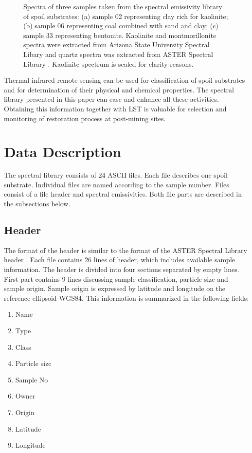\begin{appendices}
\begin{figure}[!t]
\begin{subfigure}[t]{.3\linewidth}
		\caption{}
	\end{subfigure}
	\vspace{1.5 em}
	\caption{Spectra of three samples taken from the spectral emissivity library of spoil substrates: (a) sample 02 representing clay rich for kaolinite; (b) sample 06 representing coal combined with sand and clay; (c) sample 33 representing bentonite. Kaolinite and montmorillonite spectra were extracted from Arizona State University Spectral Libary \cite{CB00} and quartz spectra was extracted from ASTER Spectral Library \cite{BH09}. Kaolinite spectrum is scaled for clarity reasons.}
	\label{fig:SpectraPreview}
\end{figure}

Thermal infrared remote sensing can be used for classification of spoil substrates and for determination of their physical and chemical properties. The spectral library presented in this paper can ease and enhance all these activities. Obtaining this information together with LST is valuable for selection and monitoring of restoration process at post-mining sites. 

\section{Data Description}

The spectral library consists of 24 ASCII files. Each file describes one spoil substrate. Individual files are named according to the sample number. Files consist of a file header and spectral emissivities. Both file parts are described in the subsections below.

\subsection{Header}

The format of the header is similar to the format of the ASTER Spectral Library header \cite{BH09}. Each file contains 26 lines of header, which includes available sample information. The header is divided into four sections separated by empty lines. First part contains 9 lines discussing sample classification, particle size and sample origin. Sample origin is expressed by latitude and longitude on the reference ellipsoid WGS84. This information is summarized in the following fields:

\begin{enumerate}
	\item	Name
	\item Type
	\item Class
	\item Particle size
	\item Sample No
	\item Owner
	\item Origin
	\item Latitude
	\item Longitude
\end{enumerate}


\end{appendices}
